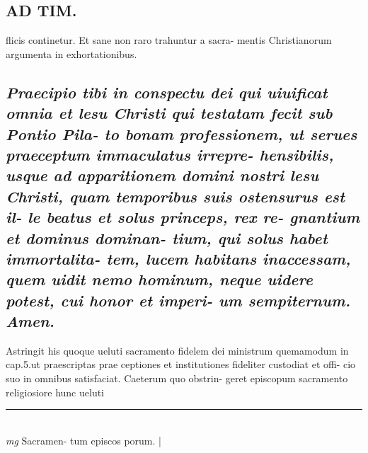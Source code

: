 \documentclass{article}
\begin{document}
\begin{pages}
\section*{AD TIM. }
\marginpar{[ p.171 ]}\pstart flicis continetur. Et sane non raro trahuntur a sacra- mentis Christianorum argumenta in exhortationibus.  \pend
{}
{}
\subsection*{\textit{Praecipio tibi in conspectu dei qui uiuificat omnia et lesu Christi qui testatam fecit sub Pontio Pila- to bonam professionem, ut serues praeceptum immaculatus irrepre- hensibilis, usque ad apparitionem domini nostri lesu Christi, quam temporibus suis ostensurus est il- le beatus et solus princeps, rex re- gnantium et dominus dominan- tium, qui solus habet immortalita- tem, lucem habitans inaccessam, quem uidit nemo hominum, neque  uidere potest, cui honor et imperi- um sempiternum. Amen. }}\pstart Astringit his quoque ueluti sacramento fidelem dei ministrum quemamodum in cap.5.ut praescriptas prae ceptiones et institutiones fideliter custodiat et offi- cio suo in omnibus satisfaciat. Caeterum quo obstrin- geret episcopum sacramento religiosiore hunc ueluti  \pend
\vspace{0.5cm}\noindent
\vspace{0.2cm}\rule{1cm}{0.2pt}\\ 
\hspace{0.2cm}\textit{mg}
\footnotesize Sacramen- tum episcos porum. 
\normalsize| 

\end{pages}
\end{document}
